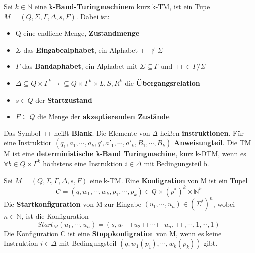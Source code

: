   Sei \(k \in \mathbb{N}\) eine \textbf{k-Band-Turingmachine}m kurz k-TM, ist ein Tupe \(M = (Q, \Sigma, \varGamma, \Delta, s, F )\). Dabei ist:
  \begin{itemize}
    \item Q eine endliche Menge, \textbf{Zustandmenge}
    \item \(\Sigma\) das \textbf{Eingabealphabet}, ein Alphabet \(\Box \not \in \Sigma\)
    \item \(\varGamma\) das \textbf{Bandaphabet}, ein Alphabet mit \(\Sigma \subseteq \varGamma\) und \(\Box \in \varGamma / \Sigma\) 
    \item \(\Delta \subseteq Q \times \varGamma^{k} \rightarrow \subseteq Q \times \varGamma^{k} \times {L, S, R}^{k}\) die \textbf{Übergangsrelation}
    \item \(s \in Q\) der \textbf{Startzustand}
    \item \(F \subseteq Q\) die Menge der \textbf{akzeptierenden Zustände} 
  \end{itemize}
  \noindent Das Symbol \(\Box\) heißt \textbf{Blank}. Die Elemente von \(\Delta\) heißen \textbf{instruktionen}. Für eine Instruktion \((q_{1}, a_{1}, \cdots, a_{k}, q', a'_{1}, \cdots, a'_{k}, B_{1}, \cdots, B_{k})\) \textbf{Anweisungteil}. Die TM M ist eine \textbf{deterministische k-Band Turingmachine}, kurz k-DTM, wenn es \(\forall b \in Q \times \varGamma^{k}\) höchstens eine Instruktion \(i \in \Delta\) mit Bedingungsteil b.

  Sei \(M = (Q, \Sigma, \Gamma, \Delta, s, F)\) eine k-TM. Eine \textbf{Konfigration} von M ist ein Tupel 
  \[
    C = (q, w_{1}, \cdots, w_{k}, p_{1}, \cdots, p_{k}) \in Q \times (p^{*})^{k} \times \mathbb{N}^{k}
  \] 
  Die \textbf{Startkonfiguration} von M zur Eingabe \((u_{1}, \cdots, u_{n}) \in (\Sigma^{*})^{n}\), wobei \(n \in \mathbb{N}\), ist die Konfiguration 
  \[
    Start_{M}(u_{1}, \cdots, u_{n}) = (s, u_{1} \Box u_{2} \Box \cdots \Box u_{n}, \Box, \cdots, 1, \cdots, 1)
  \] 
  Die Konfiguration C ist eine \textbf{Stoppkonfigration} von M, wenn es keine Instruktion \(i \in \Delta\) mit Bedingungsteil \((q, w_{1}(p_{1}), \cdots, w_{k}(p_{k}))\) gibt.

